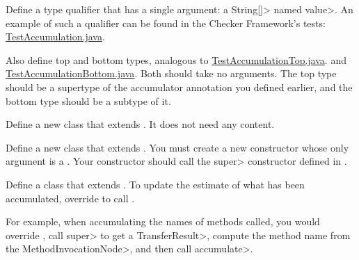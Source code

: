 Define a type qualifier that has a single argument: a \<String[]> named \<value>.
An example of such a qualifier can be found in the Checker Framework's tests:
\href{https://github.com/typetools/checker-framework/blob/master/framework/src/test/java/testaccumulation/qual/TestAccumulation.java}{TestAccumulation.java}.

Also define top and bottom types, analogous to
\href{https://github.com/typetools/checker-framework/blob/master/framework/src/test/java/testaccumulation/qual/TestAccumulationTop.java}{TestAccumulationTop.java}.
and
\href{https://github.com/typetools/checker-framework/blob/master/framework/src/test/java/testaccumulation/qual/TestAccumulationBottom.java}{TestAccumulationBottom.java}.
Both should take no arguments. The top type should be a supertype of the accumulator annotation
you defined earlier, and the bottom type should be a subtype of it.


Define a new class that extends .
It does not need any content.

Define a new class that extends .
You must create a new constructor whose only argument is a .
Your constructor should call the \<super> constructor defined in
.



Define a class that extends .
To update the estimate of what has been accumulated, override
 to call
.

For example, when accumulating the names of methods called, you would override
,
call \<super> to get a \<TransferResult>, compute the method name from the \<MethodInvocationNode>,
and then call \<accumulate>.
